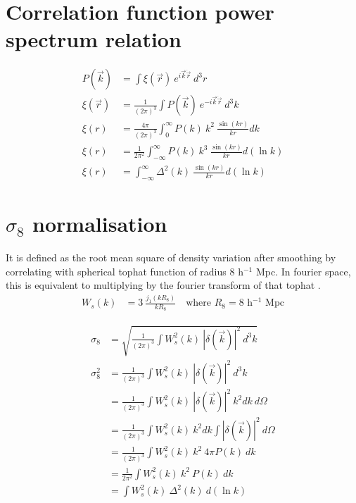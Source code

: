 \documentclass[12pt]{article}
\begin{document}
\newpage



\section*{Correlation function power spectrum relation}

\begin{align}
P(\vec{k}) &= \int \xi(\vec{r}) ~e^{i \vec{k} \dot \vec{r}} ~d^3r\\
\xi(\vec{r}) &= \frac{1}{(2\pi)^3} \int P(\vec{k}) ~e^{-i \vec{k} \dot \vec{r}} ~d^3 k\\
\xi(r) &= \frac{4 \pi}{(2\pi)^3} \int_{0}^{\infty} P(k) ~k^2 ~\frac{\sin(kr)}{kr} dk\\
\xi(r) &= \frac{1}{2\pi^2} \int_{-\infty}^{\infty} P(k) ~k^3 ~\frac{\sin(kr)}{kr} d(\ln k)\\
\xi(r) &= \int_{-\infty}^{\infty} \Delta^2(k) ~\frac{\sin(kr)}{kr} d(\ln k)
\end{align}


\section{$\sigma_8$ normalisation}
It is defined as the root mean square of density variation after smoothing by correlating with spherical tophat function of radius 8 h$^{-1}$ Mpc. In fourier space, this is equivalent to multiplying by the fourier transform of that tophat .
\begin{align}
W_s(k) &= 3 ~\frac{j_1(k R_8)}{k R_8} \quad \text{where } R_8 = 8 \text{ h$^{-1}$ Mpc}
\end{align}

\begin{align}
\sigma_8 &= \sqrt{ \frac{1}{(2 \pi)^3} \int W_s^2(k) ~|\delta (\vec{k})|^2 ~d^3k}\\
\sigma_8^2 &=  \frac{1}{(2 \pi)^3} \int W_s^2(k) ~|\delta (\vec{k})|^2 ~d^3k\\
&= \frac{1}{(2 \pi)^3} \int W_s^2(k) ~|\delta (\vec{k})|^2 ~k^2 dk ~d\Omega\\
&= \frac{1}{(2 \pi)^3} \int W_s^2(k) ~k^2 dk \int |\delta (\vec{k})|^2  ~d\Omega\\
&= \frac{1}{(2 \pi)^3} \int W_s^2(k) ~k^2 ~4\pi P(k) ~dk\\
&= \frac{1}{2 \pi^2} \int W_s^2(k) ~k^2 ~P(k) ~dk\\
&= \int W_s^2(k) ~\Delta^2(k) ~d(\ln k)
\end{align}
\end{document}
